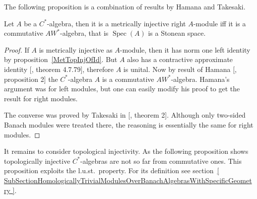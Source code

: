 The following proposition is a combination of results by Hamana and Takesaki.

\begin{proposition}\label{MetInjCStarAlgCharac} Let $A$ be a
$C^*$-algebra, then it is a metrically injective right $A$-module iff it is a
commutative $AW^*$-algebra, that is $\operatorname{Spec}(A)$ is a Stonean space.
\end{proposition}
\begin{proof} 

If $A$ is metrically injective as $A$-module, then it has norm one left identity
by proposition~\ref{MetTopInjOfId}. But $A$ also has a contractive approximate
identity  [\cite{HelBanLocConvAlg}, theorem 4.7.79], therefore $A$ is unital.
Now by result of Hamana  [\cite{HamInjEnvBanMod}, proposition 2] the
$C^*$-algebra $A$ is a commutative $AW^*$-algebra. Hamana's argument was for
left modules, but one can easily modify his proof to get the result for right
modules.

The converse was proved by Takesaki in [\cite{TakHanBanThAndJordDecomOfModMap},
theorem 2]. Although only two-sided Banach modules were treated there, the
reasoning is essentially the same for right modules.
\end{proof}

It remains to consider topological injectivity. As the following proposition
shows topologically injective $C^*$-algebras are not so far from commutative
ones. This proposition exploits the l.u.st.\ property. For its definition see
section~\ref{
    SubSectionHomologicallyTrivialModulesOverBanachAlgebrasWithSpecificGeometry
}.

